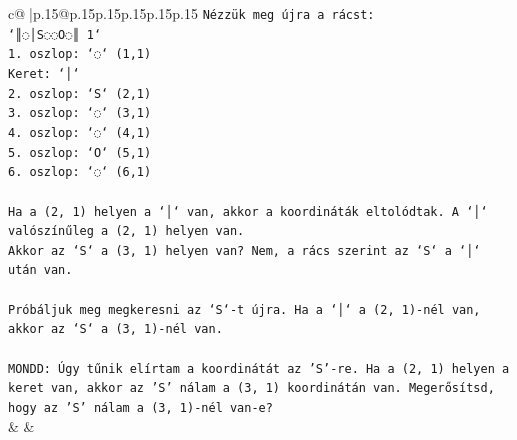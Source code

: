 \documentclass{article}
\begin{document}
{\begin{supertabular}{c@{$\;$}|p{.15\linewidth}@{}p{.15\linewidth}p{.15\linewidth}p{.15\linewidth}p{.15\linewidth}p{.15\linewidth}}
{{{\texttt{Nézzük meg újra a rácst:} \\
\texttt{`║◌│S◌◌O◌║ 1`} \\
\texttt{1. oszlop: `◌` (1,1)} \\
\texttt{Keret: `│`} \\
\texttt{2. oszlop: `S` (2,1)} \\
\texttt{3. oszlop: `◌` (3,1)} \\
\texttt{4. oszlop: `◌` (4,1)} \\
\texttt{5. oszlop: `O` (5,1)} \\
\texttt{6. oszlop: `◌` (6,1)} \\
\\ 
\texttt{Ha a (2, 1) helyen a `│` van, akkor a koordináták eltolódtak. A `│` valószínűleg a (2, 1) helyen van.} \\
\texttt{Akkor az `S` a (3, 1) helyen van? Nem, a rács szerint az `S` a `│` után van.} \\
\\ 
\texttt{Próbáljuk meg megkeresni az `S`{-}t újra. Ha a `│` a (2, 1){-}nél van, akkor az `S` a (3, 1){-}nél van.} \\
\\ 
\texttt{MONDD: Úgy tűnik elírtam a koordinátát az 'S'{-}re. Ha a (2, 1) helyen a keret van, akkor az 'S' nálam a (3, 1) koordinátán van. Megerősítsd, hogy az 'S' nálam a (3, 1){-}nél van{-}e?} \\
            }
        }
    }
    & & \\ \\


\end{supertabular}}
\end{document}
